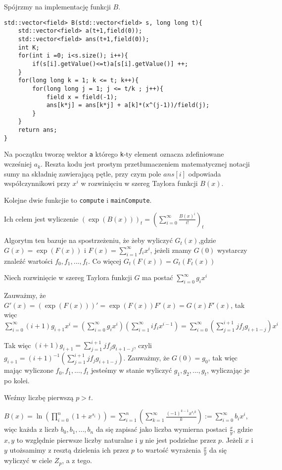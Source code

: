 \documentclass{article}
\begin{document}
Spójrzmy na implementację funkcji $B$.

\begin{lstlisting}
std::vector<field> B(std::vector<field> s, long long t){
    std::vector<field> a(t+1,field(0));
    std::vector<field> ans(t+1,field(0));
    int K;
    for(int i =0; i<s.size(); i++){
        if(s[i].getValue()<=t)a[s[i].getValue()] ++;
    }
    for(long long k = 1; k <= t; k++){
        for(long long j = 1; j <= t/k ; j++){
            field x = field(-1);
            ans[k*j] = ans[k*j] + a[k]*(x^(j-1))/field(j);
        }
    }
    return ans;
}
\end{lstlisting}

Na początku tworzę wektor \texttt{a} którego \texttt{k}-ty element oznacza zdefiniowane wcześniej $a_k$. 
Reszta kodu jest prostym przetłumaczeniem matematycznej notacji sumy na składnię zawierającą pętle, przy 
czym pole $ans[i]$ odpowiada współczynnikowi przy $x^i$ w rozwinięciu w szereg Taylora funkcji $B(x)$.

Kolejne dwie funkcjie to \texttt{compute} i \texttt{mainCompute}. 



Ich celem jest wyliczenie $(\exp(B(x)))_t=(\sum_{i=0}^\infty \frac{B(x)^i}{i!})_t$

Algorytm ten bazuje na spostrzeżeniu, że żeby wyliczyć $G_t(x)$,gdzie $G(x)=\exp(F(x))$ i $F(x) =\sum_{i=1}^\infty f_ix^i$,
jeżeli znamy $G(0)$ wystarczy znaleźć wartości $f_0,f_1,...,f_t$. Co więcej $G_t(F(x))=G_t(F_t(x))$

Niech rozwinięcie w szereg Taylora funkcji $G$ ma postać $\sum^{\infty}_{i=0}g_ix^i$

Zauważmy, że $G'(x)=(\exp(F(x)))'=\exp(F(x))F'(x)=G(x)F'(x)$, tak więc
$\sum_{i=0}^{\infty}(i+1)g_{i+1}x^{i}=(\sum_{i=0}^{\infty}g_ix^i)(\sum_{i=1}^{\infty}if_{i}x^{i-1})=
\sum_{i=0}^{\infty}(\sum_{j=1}^{i+1}jf_jg_{i+1-j})x^i$

Tak więc $(i+1)g_{i+1}=\sum_{j=1}^{i+1}jf_jg_{i+1-j}$, czyli $g_{i+1}=(i+1)^{-1}(\sum_{j=1}^{i+1}jf_jg_{i+1-j})$.
Zauważmy, że $G(0)=g_0$, tak więc mając wyliczone $f_0,f_1,...,f_t$ jesteśmy w stanie wyliczyć $g_1,g_2,...,g_t$, wyliczając je po kolei.

Weźmy liczbę pierwszą $p>t$.

$B(x)=\ln(\prod_{i=0}^n(1+x^{s_i}))=\sum_{i=1}^{n}(\sum_{k=1}^{\infty}\frac{(-1)^{k-1}x^{s_ik}}{k}):=\sum_{i=0}^{\infty}b_ix^i$, więc każda z liczb $b_0,b_1,...,b_n$ da się zapisać jako liczba wymierna postaci $\frac{x}{y}$, gdzie $x,y$ to
względnie pierwsze liczby naturalne i $y$ nie jest podzielne przez $p$. Jeżeli $x$ i $y$ utożsamimy z resztą dzielenia ich 
przez $p$ to wartość wyrażenia $\frac{x}{y}$ da się wyliczyć w ciele $Z_p$, a z tego.
\end{document}
